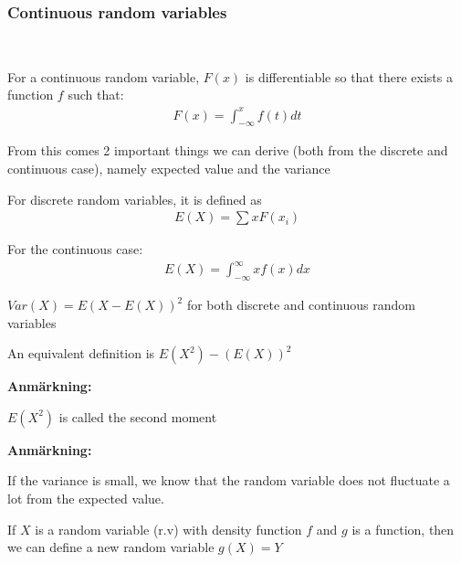 \subsubsection{Continuous random variables}\hfill\\\par
\noindent For a continuous random variable, $F(x)$ is differentiable so that there exists a function $f$ such that:
\begin{equation*}
  \begin{gathered}
    F(x) = \int_{-\infty}^{x}f(t) dt
  \end{gathered}
\end{equation*}
\par\bigskip
\noindent From this comes 2 important things we can derive (both from the discrete and continuous case), namely expected value and the variance
\par\bigskip
\begin{theo}{}
  For discrete random variables, it is defined as
  \begin{equation*}
    \begin{gathered}
      E(X) = \sum xF(x_i)
    \end{gathered}
  \end{equation*}
  \par\bigskip
  \noindent For the continuous case:
  \begin{equation*}
    \begin{gathered}
      E(X) = \int_{-\infty}^{\infty}xf(x)dx
    \end{gathered}
  \end{equation*}
\end{theo}
\par\bigskip
\begin{theo}[Variance]{}
  $Var(X) = E(X-E(X))^2$ for both discrete and continuous random variables 
  \par\bigskip
  \noindent An equivalent definition is $E(X^2)-(E(X))^2$
\end{theo}
\par\bigskip
\noindent\textbf{Anmärkning:}\par
\noindent $E(X^2)$ is called the second moment
\par\bigskip
\noindent\textbf{Anmärkning:}\par
\noindent If the variance is small, we know that the random variable does not fluctuate a lot from the expected value.
\par\bigskip
\noindent If $X$ is a random variable (r.v) with density function $f$ and $g$ is a function, then we can define a new random variable $g(X) = Y$
